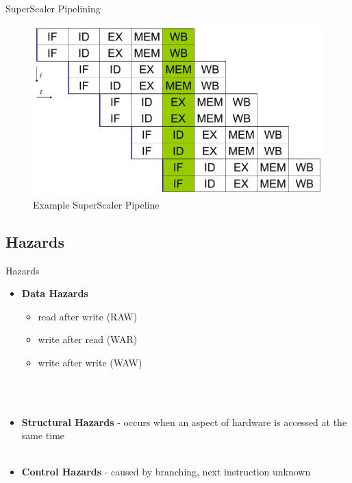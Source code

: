 \documentclass{beamer}
\begin{document}
\begin{darkframes}
\begin{frame}{SuperScaler Pipelining}
\begin{figure}
\includegraphics[scale=0.3]{figures/superscaler}
\caption{Example SuperScaler Pipeline}
\end{figure}
\end{frame}

\subsection{Hazards}
\begin{frame}{Hazards}
	\begin{itemize}
		\item {\bf \color{green} Data Hazards}
		\begin{itemize}
			\item read after write {\color{cyan} (RAW)}
			\item write after read {\color{cyan} (WAR)}
			\item write after write {\color{cyan} (WAW)}
		\end{itemize}
		\qquad \\
		\qquad \\
		\pause
		\item {\bf \color{green}  Structural Hazards} - occurs when an aspect of hardware is accessed at the same time
		\qquad \\
		\qquad \\
		\pause
		\item {\bf \color{green} Control Hazards} - caused by branching, next instruction unknown
	\end{itemize}
\end{frame}


\end{darkframes}
\end{document}
